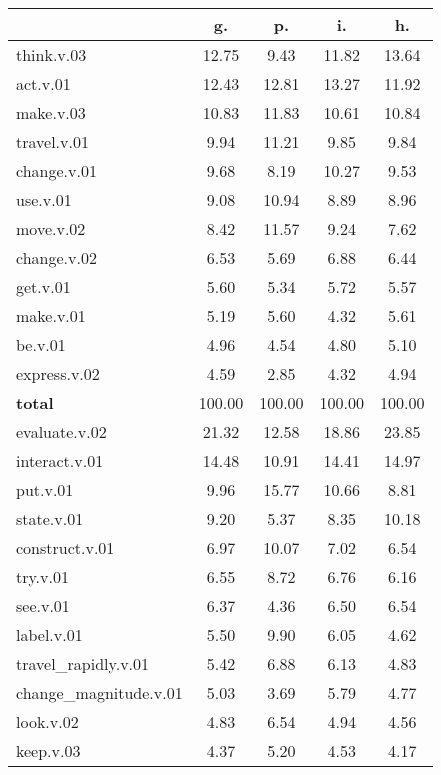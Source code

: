 \begin{table}[h!]
\begin{center}
\begin{tabular}{| l || c | c | c | c |}\hline
 & {\bf g.} & {\bf p.} & {\bf i.} & {\bf h.} \\\hline\hline
think.v.03 & 12.75  & 9.43  & 11.82  & 13.64 \\\hline
act.v.01 & 12.43  & 12.81  & 13.27  & 11.92 \\\hline
make.v.03 & 10.83  & 11.83  & 10.61  & 10.84 \\\hline
travel.v.01 & 9.94  & 11.21  & 9.85  & 9.84 \\\hline
change.v.01 & 9.68  & 8.19  & 10.27  & 9.53 \\\hline
use.v.01 & 9.08  & 10.94  & 8.89  & 8.96 \\\hline
move.v.02 & 8.42  & 11.57  & 9.24  & 7.62 \\\hline
change.v.02 & 6.53  & 5.69  & 6.88  & 6.44 \\\hline
get.v.01 & 5.60  & 5.34  & 5.72  & 5.57 \\\hline
make.v.01 & 5.19  & 5.60  & 4.32  & 5.61 \\\hline
be.v.01 & 4.96  & 4.54  & 4.80  & 5.10 \\\hline
express.v.02 & 4.59  & 2.85  & 4.32  & 4.94 \\\hline\hline
{{\bf total}} & 100.00  & 100.00  & 100.00  & 100.00 \\\hline\hline\hline
evaluate.v.02 & 21.32  & 12.58  & 18.86  & 23.85 \\\hline
interact.v.01 & 14.48  & 10.91  & 14.41  & 14.97 \\\hline
put.v.01 & 9.96  & 15.77  & 10.66  & 8.81 \\\hline
state.v.01 & 9.20  & 5.37  & 8.35  & 10.18 \\\hline
construct.v.01 & 6.97  & 10.07  & 7.02  & 6.54 \\\hline
try.v.01 & 6.55  & 8.72  & 6.76  & 6.16 \\\hline
see.v.01 & 6.37  & 4.36  & 6.50  & 6.54 \\\hline
label.v.01 & 5.50  & 9.90  & 6.05  & 4.62 \\\hline
travel\_rapidly.v.01 & 5.42  & 6.88  & 6.13  & 4.83 \\\hline
change\_magnitude.v.01 & 5.03  & 3.69  & 5.79  & 4.77 \\\hline
look.v.02 & 4.83  & 6.54  & 4.94  & 4.56 \\\hline
keep.v.03 & 4.37  & 5.20  & 4.53  & 4.17 \\\hline\hline

\end{tabular}
\end{center}
\end{table}
